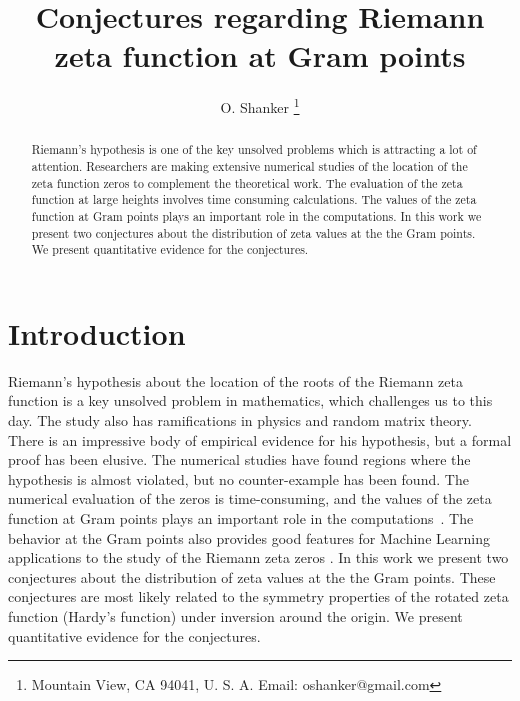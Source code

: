 \documentclass[twoside]{article}
\begin{document}
\date{}
\lhead[]{}
\rhead[]{}

\title{\bf{Conjectures regarding Riemann zeta function at Gram points}}


\author{O. Shanker 
 \thanks{Mountain View, CA 94041, U. S. A. Email: oshanker@gmail.com
 }
}

\maketitle
\thispagestyle{fancy}

\begin{abstract}
Riemann's hypothesis is one of the key unsolved problems which is attracting
a lot of attention. 
Researchers are making extensive numerical studies of the location of the 
zeta function zeros to complement the theoretical work. 
The evaluation of the zeta function at large heights involves time consuming
calculations. The values of the 
zeta function at Gram points plays an important role in the computations. In 
this work we present two conjectures about the distribution of zeta values at the 
the Gram points. We present quantitative evidence for the conjectures.
\end{abstract}




\clearpage
{}


\section{Introduction}
Riemann's hypothesis about the location of 
the roots of the Riemann zeta function is a key unsolved problem in mathematics,
which challenges us to this day. The study also has ramifications in physics and
random matrix theory. 
There is an impressive body of empirical evidence for his hypothesis,
but a formal proof has been elusive. The numerical studies have found
regions where the hypothesis is almost violated, but no counter-example has
been found. The numerical evaluation of the zeros is time-consuming, and the values of the 
zeta function at Gram points plays an important role in the computations~\cite{korolev1,korolev2}.  The behavior at the Gram points also provides good features for  Machine Learning applications to the study of the Riemann zeta zeros \cite{osneural,osentropy}.  In 
this work we present two conjectures about the distribution of zeta values at the 
the Gram points. These conjectures are most likely related to the symmetry properties of the rotated zeta function (Hardy's function) under inversion around the origin. We present quantitative evidence for the conjectures. 
\end{document}
